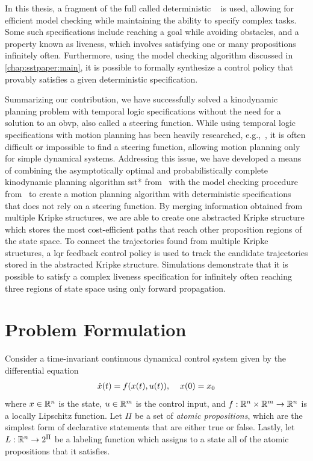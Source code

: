 In this thesis, a fragment of the full \mucalc{} called deterministic \mucalc{}~\cite{Karaman2009} is used, allowing for efficient model checking while maintaining the ability to specify complex tasks. Some such specifications include reaching a goal while avoiding obstacles, and a property known as liveness, which involves satisfying one or many propositions infinitely often. Furthermore, using the model checking algorithm discussed in \autoref{chap:sstpaper:main}, it is possible to formally synthesize a control policy that provably satisfies a given deterministic \mucalc{} specification.

Summarizing our contribution, we have successfully solved a kinodynamic planning problem with temporal logic specifications without the need for a solution to an \gls{obvp}, also called a steering function. While using temporal logic specifications with motion planning has been heavily researched, e.g.,~\cite{Ayala2013, Bhatia2010, Karaman2009,Lin2014, Wolff2014}, it is often difficult or impossible to find a steering function, allowing motion planning only for simple dynamical systems. Addressing this issue, we have developed a means of combining the asymptotically optimal and probabilistically complete kinodynamic planning algorithm \gls{sst}* from~\cite{Li2016} with the model checking procedure from~\cite{Karaman2009} to create a motion planning algorithm with deterministic \mucalc{} specifications that does not rely on a steering function. By merging information obtained from multiple Kripke structures, we are able to create one abstracted Kripke structure which stores the most cost-efficient paths that reach other proposition regions of the state space. To connect the trajectories found from multiple Kripke structures, a \gls{lqr} feedback control policy is used to track the candidate trajectories stored in the abstracted Kripke structure. Simulations demonstrate that it is possible to satisfy a complex liveness specification for infinitely often reaching three regions of state space using only forward propagation.




\section{Problem Formulation}

Consider a time-invariant continuous dynamical control system given by the differential equation
\begin{align}\label{dynsys}
    \dot x(t) = f(x(t),u(t)), \hspace{4mm} x(0) = x_0
\end{align}
where $x \in \mathbb{R}^n$ is the state, $u \in \mathbb{R}^m$ is the control input, and 
$f: \mathbb{R}^n \times \mathbb{R}^m \to \mathbb{R}^n$ is a locally Lipschitz function. Let $\Pi$ be a set of {\em atomic propositions}, which are the simplest form of declarative statements that are either true or false. Lastly, let $L: \mathbb{R}^n \to 2^\Pi$ be a labeling function which assigns to a state all of the atomic propositions that it satisfies.

